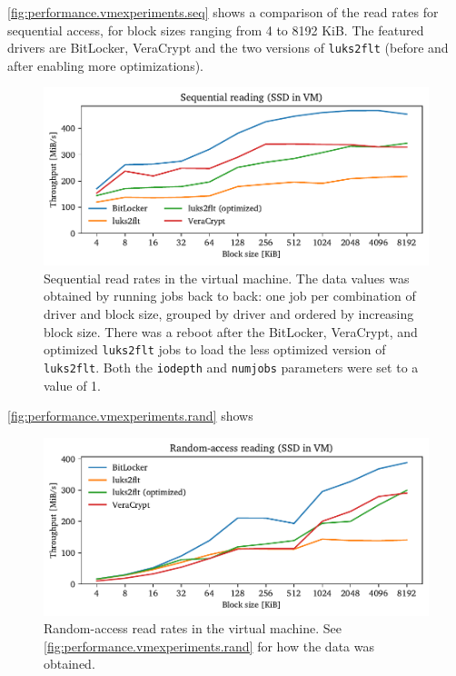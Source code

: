 \autoref{fig:performance.vmexperiments.seq} shows a comparison of the read rates for sequential access, for block sizes ranging from 4 to 8192 KiB. The featured drivers are BitLocker, VeraCrypt and the two versions of \texttt{luks2flt} (before and after enabling more optimizations). 

\begin{figure}[htb!]
	\center
	\includegraphics[scale=1]{../fig/performance.vmexperiments.seq.pdf}
	\caption[
		Sequential read rates in the virtual machine
	]{
		Sequential read rates in the virtual machine. The data values was obtained by running jobs back to back: one job per combination of driver and block size, grouped by driver and ordered by increasing block size. There was a reboot after the BitLocker, VeraCrypt, and optimized \texttt{luks2flt} jobs to load the less optimized version of \texttt{luks2flt}. Both the \texttt{iodepth} and \texttt{numjobs} parameters were set to a value of 1.
	}
	\label{fig:performance.vmexperiments.seq}
\end{figure}

\autoref{fig:performance.vmexperiments.rand} shows 

\begin{figure}[htb!]
	\center
	\includegraphics[scale=1]{../fig/performance.vmexperiments.rand.pdf}
	\caption[
		Random-access read rates in the virtual machine
	]{
		Random-access read rates in the virtual machine. See \autoref{fig:performance.vmexperiments.rand} for how the data was obtained.
	}
	\label{fig:performance.vmexperiments.rand}
\end{figure}

